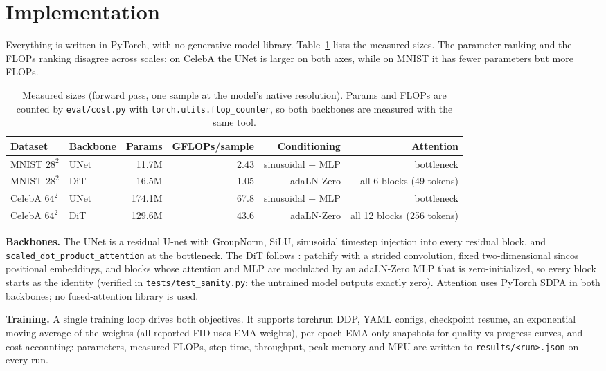\documentclass{article}
\begin{document}
\section{Implementation}
\label{sec:implementation}

Everything is written in PyTorch, with no generative-model library. Table~\ref{tab:models}
lists the measured sizes. The parameter ranking and the FLOPs ranking disagree across scales:
on CelebA the UNet is larger on both axes, while on MNIST it has fewer parameters but more
FLOPs.

\begin{table}[t]
  \caption{Measured sizes (forward pass, one sample at the model's native resolution).
  Params and FLOPs are counted by \texttt{eval/cost.py} with
  \texttt{torch.utils.flop\_counter}, so both backbones are measured with the same tool.}
  \label{tab:models}
  \centering
  \small
  \begin{tabular}{@{}llrrrr@{}}
    \toprule
    Dataset & Backbone & Params & GFLOPs/sample & Conditioning & Attention \\
    \midrule
    MNIST $28^2$ & UNet & 11.7M & 2.43 & sinusoidal + MLP & bottleneck \\
    MNIST $28^2$ & DiT  & 16.5M & 1.05 & adaLN-Zero          & all 6 blocks (49 tokens) \\
    CelebA $64^2$ & UNet & 174.1M & 67.8 & sinusoidal + MLP & bottleneck \\
    CelebA $64^2$ & DiT  & 129.6M & 43.6 & adaLN-Zero          & all 12 blocks (256 tokens) \\
    \bottomrule
  \end{tabular}
\end{table}

\textbf{Backbones.} The UNet is a residual U-net with GroupNorm, SiLU, sinusoidal timestep
injection into every residual block, and \texttt{scaled\_dot\_product\_attention} at the
bottleneck. The DiT follows \citet{peebles2023dit}: patchify with a strided convolution,
fixed two-dimensional sincos positional embeddings, and blocks whose attention and MLP are
modulated by an adaLN-Zero MLP that is zero-initialized, so every block starts as the
identity (verified in \texttt{tests/test\_sanity.py}: the untrained model outputs exactly
zero). Attention uses PyTorch SDPA in both backbones; no fused-attention library is used.

\textbf{Training.} A single training loop drives both objectives. It supports torchrun DDP,
YAML configs, checkpoint resume, an exponential moving average of the weights (all reported
FID uses EMA weights), per-epoch EMA-only snapshots for quality-vs-progress curves, and cost
accounting: parameters, measured FLOPs, step time, throughput, peak memory and MFU are
written to \texttt{results/<run>.json} on every run.
\end{document}
